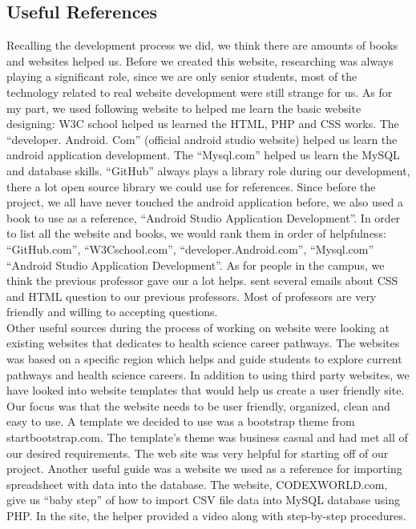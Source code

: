 \documentclass[onecolumn, draftclsnofoot,10pt, compsoc]{IEEEtran}
\begin{document}
\subsection{Useful References}
\noindent Recalling the development process we did, we think there are amounts of books and websites helped us. Before we created this website, researching was always playing a significant role, since we are only senior students, most of the technology related to real website development were still strange for us. As for my part, we used following website to helped me learn the basic website designing:
W3C school helped us learned the HTML, PHP and CSS works. 
The “developer. Android. Com” (official android studio website) helped us learn the android application development. 
The “Mysql.com” helped us learn the MySQL and database skills.
“GitHub” always plays a library role during our development, there a lot open source library we could use for references.
Since before the project, we all have never touched the android application before, we also used a book to use as a reference, “Android Studio Application Development”. 
In order to list all the website and books, we would rank them in order of helpfulness:
“GitHub.com”, “W3Cschool.com”, “developer.Android.com”, “Mysql.com” “Android Studio Application Development”.
As for people in the campus, we think the previous professor gave our a lot helps. sent several emails about CSS and HTML question to our previous professors. Most of professors are very friendly and willing to accepting questions. \\
\noindent Other useful sources during the process of working on website were looking at existing websites that dedicates to health science career pathways.
The websites was based on a specific region which helps and guide students to explore current pathways and health science careers.
In addition to using third party websites, we have looked into website templates that would help us create a user friendly site.
Our focus was that the website needs to be user friendly, organized, clean and easy to use. 
A template we decided to use was a bootstrap theme from startbootstrap.com. The template’s theme was business casual and had met all of our desired requirements.
The web site was very helpful for starting off of our project. 
Another useful guide was a website we used as a reference for importing spreadsheet with data into the database. 
The website, CODEXWORLD.com, give us “baby step” of how to import CSV file data into MySQL database using PHP.
In the site, the helper provided a video along with step-by-step procedures. \\
\end{document}
